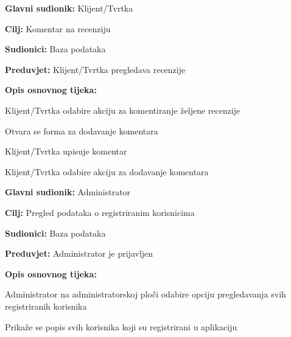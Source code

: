 \pagebreak
\noindent {}
\begin{packed_item}
	
	\item \textbf{Glavni sudionik:} Klijent/Tvrtka
	\item  \textbf{Cilj:} Komentar na recenziju
	\item  \textbf{Sudionici:} Baza podataka
	\item  \textbf{Preduvjet:} Klijent/Tvrtka pregledava recenzije
	\item  \textbf{Opis osnovnog tijeka:}
	
	\item[] \begin{packed_enum}
		
		\item Klijent/Tvrtka odabire akciju za komentiranje željene recenzije
		\item Otvara se forma za dodavanje komentara
		\item Klijent/Tvrtka upisuje komentar
		\item Klijent/Tvrtka odabire akciju za dodavanje komentara
		
	\end{packed_enum}
\end{packed_item}



\noindent {}
\begin{packed_item}
	
	\item \textbf{Glavni sudionik:} Administrator
	\item  \textbf{Cilj:} Pregled podataka o registriranim korisnicima
	\item  \textbf{Sudionici:} Baza podataka
	\item  \textbf{Preduvjet:} Administrator je prijavljen
	\item  \textbf{Opis osnovnog tijeka:}
	
	\item[] \begin{packed_enum}
		
		\item Administrator na administratorskoj ploči odabire opciju pregledavanja svih registriranih korisnika 
		\item Prikaže se popis svih korisnika koji su registrirani u aplikaciju
	\end{packed_enum}
\end{packed_item}



